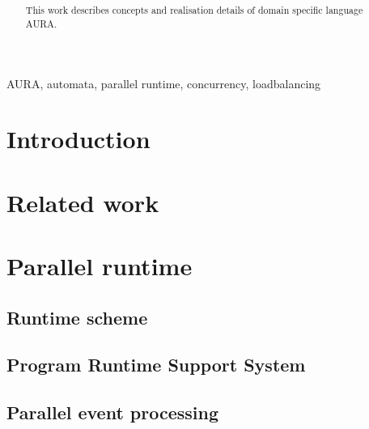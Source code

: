 \documentclass[10pt, conference, compsocconf]{IEEEtran}
\begin{document}
\title{
}

\author{
}


\maketitle
\begin{abstract}
This work describes concepts and realisation details of domain specific
language AURA.

\end{abstract}

\begin{IEEEkeywords}
AURA, automata, parallel runtime, concurrency, loadbalancing
\end{IEEEkeywords}

\section{Introduction}



\section{Related work}


\section{Parallel runtime}
\subsection{Runtime scheme}

\subsection{Program Runtime Support System}

\subsection{Parallel event processing}
\end{document}
